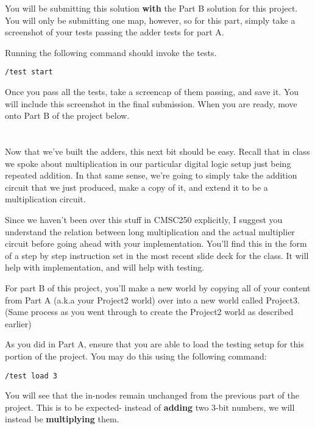 \documentclass{article}
\begin{document}
You will be submitting this solution \textbf{with} the Part B solution for this project. You will only be submitting one map, however, so for this part, simply take a screenshot of your tests passing the adder tests for part A.

Running the following command should invoke the tests.

\begin{tcolorbox}
  \texttt{/test start}
\end{tcolorbox}

Once you pass all the tests, take a screencap of them passing, and save it. You will include this screenshot in the final submission. When you are ready, move onto Part B of the project below.

\section{\selectfont{Part B: Building the Multipliers}}

Now that we've built the adders, this next bit should be easy.
Recall that in class we spoke about multiplication in our particular digital logic setup just being repeated addition. In that same sense, we're going to simply take the addition circuit that we just produced, make a copy of it, and extend it to be a multiplication circuit.

Since we haven't been over this stuff in CMSC250 explicitly, I suggest you understand the relation between long multiplication and the actual multiplier circuit before going ahead with your implementation. You'll find this in the form of a step by step instruction set in the most recent slide deck for the class.
It will help with implementation, and will help with testing.

For part B of this project, you'll make a new world by copying all of your content from Part A (a.k.a your Project2 world) over into a new world called Project3. (Same process as you went through to create the Project2 world as described earlier)

As you did in Part A, ensure that you are able to load the testing setup for this portion of the project. You may do this using the following command:

\begin{tcolorbox}
  \texttt{/test load 3}
\end{tcolorbox}

You will see that the in-nodes remain unchanged from the previous part of the project.
This is to be expected- instead of \textbf{adding} two 3-bit numbers, we will instead be \textbf{multiplying} them.
\end{document}
